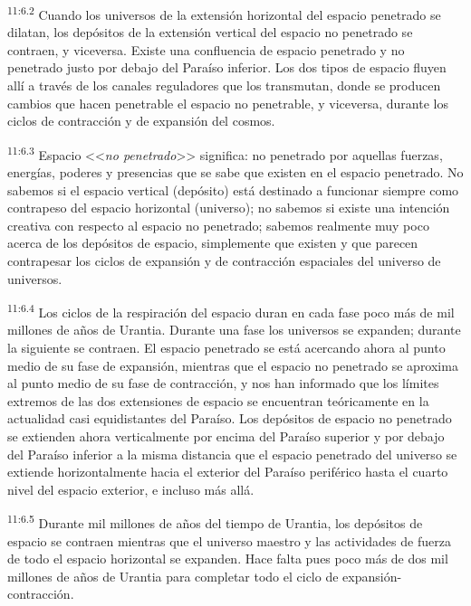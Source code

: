 \par
\textsuperscript{11:6.2} Cuando los universos de la extensión horizontal del espacio penetrado se dilatan, los depósitos de la extensión vertical del espacio no penetrado se contraen, y viceversa. Existe una confluencia de espacio penetrado y no penetrado justo por debajo del Paraíso inferior. Los dos tipos de espacio fluyen allí a través de los canales reguladores que los transmutan, donde se producen cambios que hacen penetrable el espacio no penetrable, y viceversa, durante los ciclos de contracción y de expansión del cosmos.

\par
\textsuperscript{11:6.3} Espacio <<\textit{no penetrado}>> significa: no penetrado por aquellas fuerzas, energías, poderes y presencias que se sabe que existen en el espacio penetrado. No sabemos si el espacio vertical (depósito) está destinado a funcionar siempre como contrapeso del espacio horizontal (universo); no sabemos si existe una intención creativa con respecto al espacio no penetrado; sabemos realmente muy poco acerca de los depósitos de espacio, simplemente que existen y que parecen contrapesar los ciclos de expansión y de contracción espaciales del universo de universos.

\par
\textsuperscript{11:6.4} Los ciclos de la respiración del espacio duran en cada fase poco más de mil millones de años de Urantia. Durante una fase los universos se expanden; durante la siguiente se contraen. El espacio penetrado se está acercando ahora al punto medio de su fase de expansión, mientras que el espacio no penetrado se aproxima al punto medio de su fase de contracción, y nos han informado que los límites extremos de las dos extensiones de espacio se encuentran teóricamente en la actualidad casi equidistantes del Paraíso. Los depósitos de espacio no penetrado se extienden ahora verticalmente por encima del Paraíso superior y por debajo del Paraíso inferior a la misma distancia que el espacio penetrado del universo se extiende horizontalmente hacia el exterior del Paraíso periférico hasta el cuarto nivel del espacio exterior, e incluso más allá.

\par
\textsuperscript{11:6.5} Durante mil millones de años del tiempo de Urantia, los depósitos de espacio se contraen mientras que el universo maestro y las actividades de fuerza de todo el espacio horizontal se expanden. Hace falta pues poco más de dos mil millones de años de Urantia para completar todo el ciclo de expansión-contracción.

